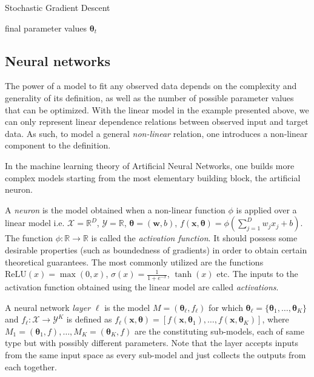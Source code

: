 \begin{algorithm}
\caption{Stochastic Gradient Descent}
\label{algorithm:sgd}
\begin{algorithmic}
\ENDWHILE
\RETURN final parameter values $\pmb{\theta}_{t}$
\end{algorithmic}
\end{algorithm} 


\subsection{Neural networks}
The power of a model to fit any observed data depends on the complexity and generality of its definition, as well as the number of possible parameter values that can be optimized. With the linear model in the example presented above, we can only represent linear dependence relations between observed input and target data. As such, to model a general \emph{non-linear} relation, one introduces a non-linear component to the definition.

In the machine learning theory of Artificial Neural Networks, one builds more complex models starting from the most elementary building block, the artificial neuron.
\begin{definition}
A \emph{neuron} is the model obtained when a non-linear function $\phi$ is applied over a linear model i.e. $\mathcal{X} = \mathbb{R}^D$, $\mathcal{Y}=\mathbb{R}$, $\pmb{\theta} = (\pmb{w}, b)$, $f(\pmb{x}, \pmb{\theta}) = \phi\left(\sum_{j=1}^{D}{w_j x_j} + b\right)$. The function $\phi: \mathbb{R} \to \mathbb{R}$ is called the \emph{activation function}. It should possess some desirable properties (such as boundedness of gradients) in order to obtain certain theoretical guarantees. The most commonly utilized are the functions $\text{ReLU}(x)=\max(0,x)$, $\sigma(x)=\frac{1}{1+e^{-x}}$, $\tanh(x)$ etc. The inputs to the activation function obtained using the linear model are called \emph{activations}.
\end{definition}

\begin{definition}
A neural network \emph{layer} $\ell$ is the model $M = (\pmb{\theta}_{\ell}, f_{\ell})$ for which $\pmb{\theta}_{\ell} = \{\pmb{\theta}_1, \dots, \pmb{\theta}_K\}$ and $f_{\ell}: \mathcal{X} \to \mathcal{Y}^K$ is defined as $f_{\ell}(\pmb{x}, \pmb{\theta}) = [f(\pmb{x}, \pmb{\theta}_1),\dots,f(\pmb{x}, \pmb{\theta}_K)]$, where $M_1=(\pmb{\theta}_1, f),\dots,M_K=(\pmb{\theta}_K, f)$ are the constituting sub-models, each of same type but with possibly different parameters. Note that the layer accepts inputs from the same input space as every sub-model and just collects the outputs from each together.
\end{definition}

